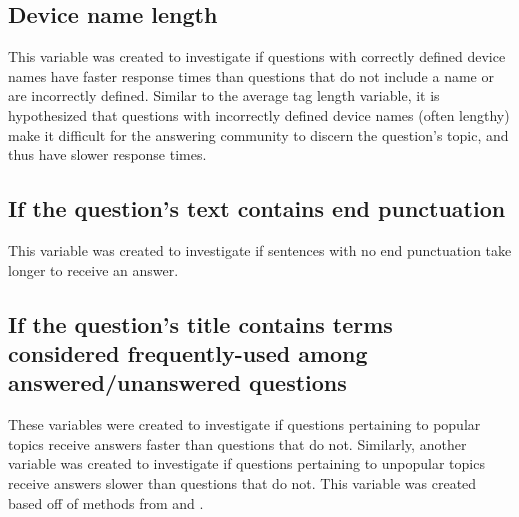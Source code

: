 \documentclass[]{interact}\usepackage[]{graphicx}\usepackage[]{color}
\begin{document}
\subsection{Device name length}

This variable was created to investigate if questions with correctly defined device names have faster response times than questions that do not include a name or are incorrectly defined. Similar to the average tag length variable, it is hypothesized that questions with incorrectly defined device names (often lengthy) make it difficult for the answering community to discern the question's topic, and thus have slower response times. 


\subsection{If the question's text contains end punctuation}

This variable was created to investigate if sentences with no end punctuation take longer to receive an answer.


\subsection{If the question's title contains terms considered frequently-used among answered/unanswered questions}

These variables were created to investigate if questions pertaining to popular topics receive answers faster than questions that do not. Similarly, another variable was created to investigate if questions pertaining to unpopular topics receive answers slower than questions that do not. This variable was created based off of methods from \cite{Correa2013} and \cite{Ravi2014}.
\end{document}
